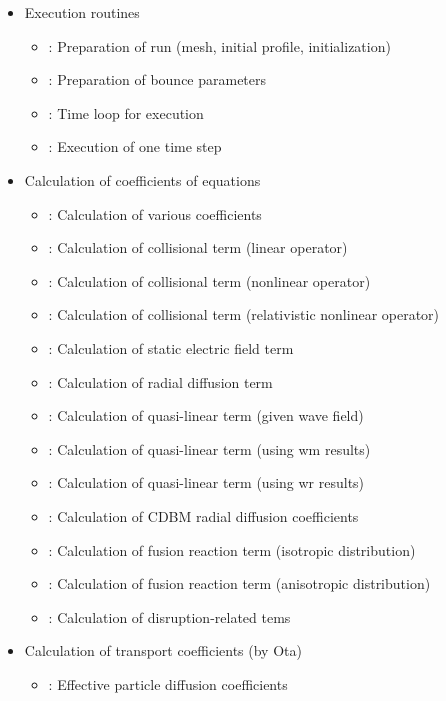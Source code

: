 \documentclass[11pt]{article}
\begin{document}
\begin{itemize}
\item
    Execution routines
    \begin{itemize}
    \item[] : Preparation of run (mesh, initial profile,
      initialization)
    \item[] : Preparation of bounce parameters
    \item[] : Time loop for execution
    \item[] : Execution of one time step
\end{itemize}
\item
  Calculation of coefficients of equations
  \begin{itemize}
  \item[] : Calculation of various coefficients
  \item[] : Calculation of collisional term (linear operator)
  \item[] : Calculation of collisional term (nonlinear operator)
  \item[] : Calculation of collisional term (relativistic nonlinear operator)
  \item[] : Calculation of static electric field term
  \item[] : Calculation of radial diffusion term
  \item[] : Calculation of quasi-linear term (given wave field)
  \item[] : Calculation of quasi-linear term (using wm results)
  \item[] : Calculation of quasi-linear term (using wr results)
  \item[] : Calculation of CDBM radial diffusion coefficients
  \item[] : Calculation of fusion reaction term (isotropic distribution)
  \item[] :  Calculation of fusion reaction term (anisotropic distribution)
  \item[] : Calculation of disruption-related tems
  \end{itemize}
\item
  Calculation of transport coefficients (by Ota)
  \begin{itemize}
  \item[] : Effective particle diffusion coefficients

\end{itemize}
\end{itemize}
\end{document}
